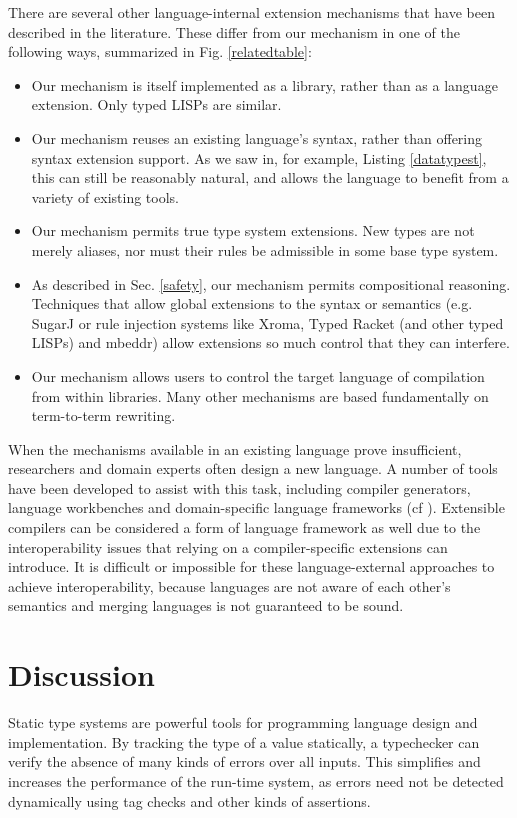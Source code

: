 \documentclass[10pt,preprint]{sigplanconf}
\begin{document}
{There are several other language-internal extension mechanisms that have been described in the literature. These differ from our mechanism in one of the following ways, summarized in Fig. \ref{relatedtable}:
\begin{itemize}
\item Our mechanism is itself implemented as a library, rather than as a language extension. Only typed LISPs are similar.
\item Our mechanism reuses an existing language's syntax, rather than offering syntax extension support. As we saw in, for example, Listing \ref{datatypest}, this can still be reasonably natural, and allows the language to benefit from a variety of existing tools.
\item Our mechanism permits true type system extensions. New types are not merely aliases, nor must their rules be admissible in some base type system.%
\item As described in Sec. \ref{safety}, our mechanism permits compositional reasoning. Techniques that allow global extensions to the syntax or semantics (e.g. SugarJ or rule injection systems like Xroma, Typed Racket (and other typed LISPs) and mbeddr) allow extensions so much control that they can interfere.
\item Our mechanism allows users to control the target language of compilation from within libraries. Many other mechanisms are based fundamentally on term-to-term rewriting.
\end{itemize}

When the mechanisms available in an existing language prove insufficient, researchers and domain experts often design a new language. A number of tools have been developed to assist with this task, including compiler generators, language workbenches and domain-specific language frameworks (cf \cite{erdweg2013state}). Extensible compilers can be considered a form of language framework as well due to the interoperability issues that relying on a compiler-specific extensions can introduce. It is difficult or impossible for these language-external approaches to achieve interoperability, because languages are not aware of each other's semantics and merging languages is not guaranteed to be sound.

\section{Discussion}\label{discussion}
Static type systems are powerful tools for programming language design and implementation. By tracking the type of a value statically, a typechecker can verify the absence of many kinds of errors over all inputs. This simplifies and increases the performance of the run-time system, as errors need not be detected dynamically using tag checks and other kinds of assertions.

}
\end{document}
